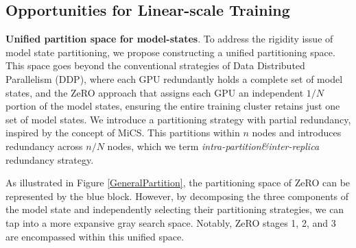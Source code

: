 






\subsection{Opportunities for Linear-scale Training}

\noindent\textbf{Unified partition space for model-states}.
\label{flexibleParSpace}
To address the rigidity issue of model state partitioning, we propose constructing a unified partitioning space. This space goes beyond the conventional strategies of Data Distributed Parallelism (DDP), where each GPU redundantly holds a complete set of model states, and the ZeRO approach that assigns each GPU an independent $1/N$ portion of the model states, ensuring the entire training cluster retains just one set of model states. We introduce a partitioning strategy with partial redundancy, inspired by the concept of MiCS. This partitions within $n$ nodes and introduces redundancy across $n/N$ nodes, which we term \emph{intra-partition\&inter-replica} redundancy strategy.

As illustrated in Figure \ref{GeneralPartition}, the partitioning space of ZeRO can be represented by the blue block. However, by decomposing the three components of the model state and independently selecting their partitioning strategies, we can tap into a more expansive gray search space. Notably, ZeRO stages 1, 2, and 3 are encompassed within this unified space.



